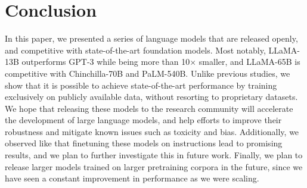 \section{Conclusion}

 In this paper, we presented a series of language models that are released openly, and competitive with state-of-the-art foundation models. Most notably, LLaMA-13B outperforms GPT-3 while being more than 10$\times$ smaller, and LLaMA-65B is competitive with Chinchilla-70B and PaLM-540B. Unlike previous studies, we show that it is possible to achieve state-of-the-art performance by training exclusively on publicly available data, without resorting to proprietary datasets. We hope that releasing these models to the research community will accelerate the development of large language models, and help efforts to improve their robustness and mitigate known issues such as toxicity and bias. Additionally, we observed like \citet{Chung2022ScalingIL} that finetuning these models on instructions lead to promising results, and we plan to further investigate this in future work. Finally, we plan to release larger models trained on larger pretraining corpora in the future, since we have seen a constant improvement in performance as we were scaling.


